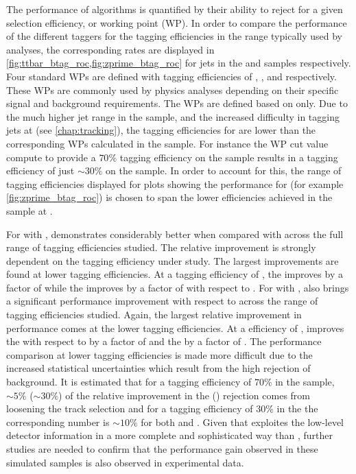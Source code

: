 The performance of \btag algorithms is quantified by their ability to reject \cljets for a given \bjet selection efficiency, or working point (WP). 
In order to compare the \btag performance of the different taggers for the \bjet tagging efficiencies in the range typically used by analyses, the corresponding \clrej rates are displayed in \cref{fig:ttbar_btag_roc,fig:zprime_btag_roc} for jets in the \ttbar and \Zprime samples respectively.
Four standard WPs are defined with \bjet tagging efficiencies of , ,  and  respectively.
These WPs are commonly used by physics analyses depending on their specific signal and background requirements.
The WPs are defined based on \ttbarjets only.
Due to the much higher jet \pt range in the \Zprime sample, and the increased difficulty in tagging jets at \highpt (see \cref{chap:tracking}), the \bjet tagging efficiencies for \Zprimejets are lower than the corresponding WPs calculated in the \ttbar sample.
For instance the WP cut value compute to provide a $70\%$ \bjet tagging efficiency on the \ttbar sample results in a \bjet tagging efficiency of just $\sim30\%$ on the \Zprime sample.
In order to account for this, the range of \bjet tagging efficiencies displayed for plots showing the performance for \Zprimejets (for example \cref{fig:zprime_btag_roc}) is chosen to span the lower efficiencies achieved in the \Zprime sample at \highpt.

For \ttbarjets with \ttbarpt, \GNN demonstrates considerably better \clrej when compared with \DLr across the full range of \bjet tagging efficiencies studied.
The relative improvement is strongly dependent on the \bjet tagging efficiency under study.
The largest improvements are found at lower \bjet tagging efficiencies.
At a \bjet tagging efficiency of \pct{\ttlo}, the \crej improves by a factor of \ttbclo while the \lrej improves by a factor of \ttbllo with respect to \DLr.
For \highpt \Zprimejets with \Zprimept, \GNN also brings a significant performance improvement with respect to \DLr across the range of \bjet tagging efficiencies studied.
Again, the largest relative improvement in performance comes at the lower \bjet tagging efficiencies.
At a \bjet efficiency of \pct{\zplo}, \GNN improves the \crej with respect to \DLr by a factor of \zpbclo and the \lrej by a factor of \zpbllo.
The performance comparison at lower \bjet tagging efficiencies is made more difficult due to the increased statistical uncertainties which result from the high rejection of background.
It is estimated that for a \bjet tagging efficiency of $70\%$ in the \ttbar sample, $\sim5\%$ ($\sim30\%$) of the relative improvement in the \cjet (\ljet) rejection comes from loosening the track selection and for a \bjet tagging efficiency of $30\%$ in the \Zprime the corresponding number is $\sim10\%$ for both \cjets and \ljets.
Given that \GNN exploites the low-level detector information in a more complete and sophisticated way than \DLr, further studies are needed to confirm that the performance gain observed in these simulated samples is also observed in experimental data.

